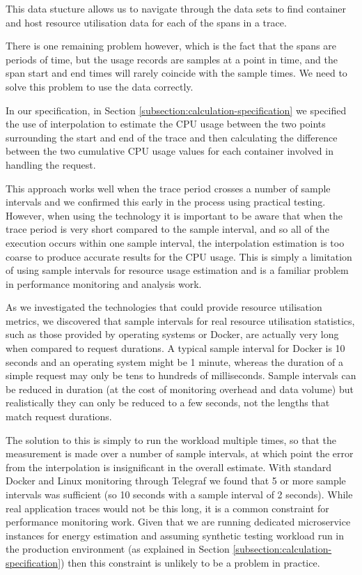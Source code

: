 This data stucture allows us to navigate through the data sets to find container and host resource utilisation data for each of the spans in a trace.

There is one remaining problem however, which is the fact that the spans are periods of time, but the usage records are samples at a point in time, and the span start and end times will rarely coincide with the sample times.  We need to solve this problem to use the data correctly.

In our specification, in Section \ref{subsection:calculation-specification} we specified the use of interpolation to estimate the CPU usage between the two points surrounding the start and end of the trace and then calculating the difference between the two cumulative CPU usage values for each container involved in handling the request.  

This approach works well when the trace period crosses a number of sample intervals and we confirmed this early in the process using practical testing.  However, when using the technology it is important to be aware that when the trace period is very short compared to the sample interval, and so all of the execution occurs within one sample interval, the interpolation estimation is too coarse to produce accurate results for the CPU usage.  This is simply a limitation of using sample intervals for resource usage estimation and is a familiar problem in performance monitoring and analysis work.

As we investigated the technologies that could provide resource utilisation metrics, we discovered that sample intervals for real resource utilisation statistics, such as those provided by operating systems or Docker, are actually very long when compared to request durations.  A typical sample interval for Docker is 10 seconds and an operating system might be 1 minute, whereas the duration of a simple request may only be tens to hundreds of milliseconds.  Sample intervals can be reduced in duration (at the cost of monitoring overhead and data volume) but realistically they can only be reduced to a few seconds, not the lengths that match request durations.

The solution to this is simply to run the workload multiple times, so that the measurement is made over a number of sample intervals, at which point the error from the interpolation is insignificant in the overall estimate.  With standard Docker and Linux monitoring through Telegraf we found that 5 or more sample intervals was sufficient (so 10 seconds with a sample interval of 2 seconds).  While real application traces would not be this long, it is a common constraint for performance monitoring work.  Given that we are running dedicated microservice instances for energy estimation and assuming synthetic testing workload run in the production environment (as explained in Section \ref{subsection:calculation-specification}) then this constraint is unlikely to be a problem in practice.


